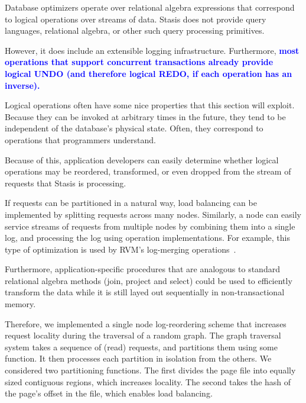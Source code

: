 \documentclass[letterpaper,twocolumn,10pt]{article}
\newcommand{\yad}{Stasis\xspace}
\newcommand{\diff}[1]{\textcolor{blue}{\bf #1}}
\begin{document}
Database optimizers operate over relational algebra expressions that
correspond to logical operations over streams of data.  \yad
does not provide query languages, relational algebra, or other such query processing primitives.  

However, it does include an extensible logging infrastructure.
Furthermore, \diff{most operations that support concurrent transactions already
provide logical UNDO (and therefore logical REDO, if each operation has an
inverse).}

Logical operations often have some nice properties that this section
will exploit.  Because they can be invoked at arbitrary times in the
future, they tend to be independent of the database's physical state.
Often, they correspond to operations that programmers understand.

Because of this, application developers can easily determine whether
logical operations may be reordered, transformed, or even
dropped from the stream of requests that \yad is processing.

If requests can be partitioned in a natural way, load
balancing can be implemented by splitting requests across many nodes.
Similarly, a node can easily service streams of requests from multiple
nodes by combining them into a single log, and processing the log
using operation implementations.  For example, this type of optimization 
is used by RVM's log-merging operations~\cite{lrvm}.

Furthermore, application-specific
procedures that are analogous to standard relational algebra methods
(join, project and select) could be used to efficiently transform the data
while it is still layed out sequentially
in non-transactional memory.


Therefore, we implemented a single node log-reordering scheme that increases request locality
during the traversal of a random graph.  The graph traversal system
takes a sequence of (read) requests, and partitions them using some
function.  It then processes each partition in isolation from the
others.  We considered two partitioning functions.  The first divides the page file
into equally sized contiguous regions, which increases locality.  The second takes the hash
of the page's offset in the file, which enables load balancing.
\end{document}
